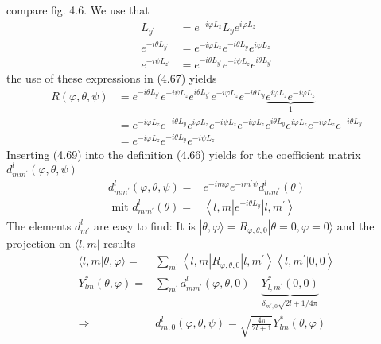 compare fig. 4.6. We use that
\begin{equation}
\begin{aligned} L_{y^{\prime}} &=e^{-i \varphi L_{z}} L_{y} e^{i \varphi L_{z}} \\ e^{-i \theta L_{y^{\prime}}} &=e^{-i \varphi L_{z}} e^{-i \theta L_{y}} e^{i \varphi L_{z}} \\ e^{-i \psi L_{z^{\prime}}} &=e^{-i \theta L_{y^{\prime}}} e^{-i \psi L_{z}} e^{i \theta L_{y^{\prime}}} \end{aligned}
\end{equation}
the use of these expressions in (4.67) yields
\begin{equation}
\begin{aligned} R(\varphi, \theta, \psi) &=e^{-i \theta L_{y^{\prime}}} e^{-i \psi L_{z}} e^{i \theta L_{y^{\prime}}} e^{-i \varphi L_{z}} e^{-i \theta L_{y}} \underbrace{e^{i \varphi L_{z}} e^{-i \varphi L_{z}}}_{1} \\ &=e^{-i \varphi L_{z}} e^{-i \theta L_{y}} e^{i \varphi L_{z}} e^{-i \psi L_{z}} e^{-i \varphi L_{z}} e^{i \theta L_{y}} e^{i \varphi L_{z}} e^{-i \varphi L_{z}} e^{-i \theta L_{y}} \\ &=e^{-i \varphi L_{z}} e^{-i \theta L_{y}} e^{-i \psi L_{z}} \end{aligned}
\end{equation}
Inserting (4.69) into the definition (4.66) yields for the coefficient matrix $d^l_{mm^{\prime}} (\varphi, \theta, \psi)$
\begin{equation}
\begin{aligned} d_{m m^{\prime}}^{l}(\varphi, \theta, \psi)=& e^{-i m \varphi} e^{-i m^{\prime} \psi} d_{m m^{\prime}}^{l}(\theta) \\ \text { mit } d_{m m^{\prime}}^{l}(\theta)=& \left\langle l, m\left|e^{-i \theta L_{y}}\right| l, m^{\prime}\right\rangle \end{aligned}
\end{equation}
The elements $d^l_{m^{\prime}}$ are easy to find: It is $|\theta,\varphi\rangle = R_{φ, \theta, 0} | \theta = 0, \varphi = 0\rangle$ and the projection on $\langle l, m |$ results
\begin{equation}
\begin{aligned}\langle l, m | \theta, \varphi\rangle=& \sum_{m^{\prime}}\left\langle l, m\left|R_{\varphi, \theta, 0}\right| l, m^{\prime}\right\rangle\left\langle l, m^{\prime} | 0,0\right\rangle \\ Y_{l m}^{*}(\theta, \varphi)=& \sum_{m^{\prime}} d_{m m^{\prime}}^{l}(\varphi, \theta, 0) \quad \underbrace{Y_{l, m^{\prime}}^{*}(0,0)}_{\delta_{m^{\prime}, 0} \sqrt{2 l+1 / 4 \pi}} \\ \Rightarrow & d_{m, 0}^{l}(\varphi, \theta, \psi)=\sqrt{\frac{4 \pi}{2 l+1}} Y_{l m}^{*}(\theta, \varphi) \end{aligned}
\end{equation}
